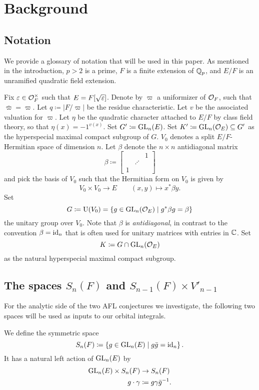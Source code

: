 \section{Background}
\label{sec:background}

\subsection{Notation}
We provide a glossary of notation that will be used in this paper.
As mentioned in the introduction, $p > 2$ is a prime,
$F$ is a finite extension of $\mathbb Q_p$,
and $E/F$ is an unramified quadratic field extension.

\begin{itemize}
  \ii Fix $\varepsilon \in \mathcal O_F^\times$ such that $E = F[\sqrt{\varepsilon}]$.
  \ii Denote by $\varpi$ a uniformizer of $\mathcal O_F$, such that $\bar \varpi = \varpi$.
  \ii Let $q \coloneqq |F/\varpi|$ be the residue characteristic.
  \ii Let $v$ be the associated valuation for $\varpi$.
  \ii Let $\eta$ be the quadratic character attached to $E/F$ by class field theory,
  so that $\eta(x) = -1^{v(x)}$.
  \ii Set $G' \coloneqq \operatorname{GL}_n(E)$.
  \ii Set $K' \coloneqq \operatorname{GL}_n(\mathcal O_E) \subseteq G'$ as the hyperspecial maximal compact subgroup of $G$.
  \ii $V_0$ denotes a split $E/F$-Hermitian space of dimension $n$.
  \ii Let $\beta$ denote the $n \times n$ antidiagonal matrix
  \[ \beta \coloneqq \begin{bmatrix} && 1 \\ & \iddots \\ 1 \end{bmatrix} \]
  and pick the basis of $V_0$ such that the Hermitian form on $V_0$ is given by
  \[ V_0 \times V_0 \to E \qquad (x,y) \mapsto x^\ast \beta y. \]
  \ii Set
  \[ G \coloneqq \operatorname{U}(V_0) = \{ g \in \operatorname{GL}_n(\mathcal O_E) \mid g^\ast \beta g = \beta\} \]
  the unitary group over $V_0$.
  Note that $\beta$ is \emph{antidiagonal}, in contrast to the convention $\beta = \operatorname{id}_n$
  that is often used for unitary matrices with entries in $\mathbb C$.
  \ii Set
  \[ K \coloneqq G \cap \operatorname{GL}_n(\mathcal O_E) \]
  as the natural hyperspecial maximal compact subgroup.
\end{itemize}

\subsection{The spaces $S_n(F)$ and $S_{n-1}(F) \times V'_{n-1}$}
For the analytic side of the two AFL conjectures we investigate,
the following two spaces will be used as inputs to our orbital integrals.
\begin{definition}
  We define the symmetric space
  \[ S_n(F) \coloneqq \left\{ g \in \operatorname{GL}_n(E) \mid g \bar g = \operatorname{id}_n \right\}. \]
  It has a natural left action of $\operatorname{GL}_n(E)$ by
  \begin{align*}
    \operatorname{GL}_n(E) \times S_n(F) &\to S_n(F) \\
    g \cdot \gamma &\coloneqq g \gamma \bar g^{-1}.
  \end{align*}
\end{definition}

